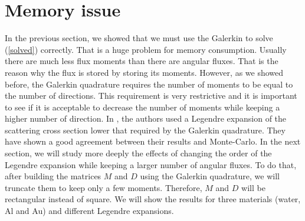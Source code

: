 \section{Memory issue}
In the previous section, we showed that we must use the Galerkin to solve
(\ref{solved}) correctly. That is a huge problem for memory consumption. Usually 
there are much less flux moments than there are angular fluxes. That is the
reason why the flux is stored by storing its moments. However, as we showed 
before, the Galerkin quadrature requires the number of moments to be equal to the 
number of directions. This requirement is very restrictive and it is important to 
see if it is acceptable to decrease the number of moments while keeping a higher 
number of direction. In \cite{mem}, the authors used a Legendre expansion of the 
scattering cross section lower that required by the Galerkin quadrature. They have 
shown a good agreement between their results and Monte-Carlo. In the next section, 
we will study more deeply the effects of changing the order of the Legendre 
expansion while keeping a larger number of angular fluxes. To do that, after 
building the matrices $M$ and $D$ using the Galerkin quadrature, we will 
truncate them to keep only a few moments. Therefore, $M$ and $D$ will be rectangular 
instead of square. We will show the results for three materials (water, Al and Au) 
and different Legendre expansions.
